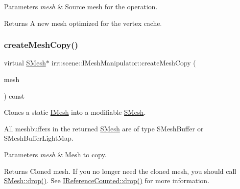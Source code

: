 \begin{DoxyParams}{Parameters}
{\em mesh} & Source mesh for the operation. \\
\hline
\end{DoxyParams}
\begin{DoxyReturn}{Returns}
A new mesh optimized for the vertex cache. 
\end{DoxyReturn}
\mbox{\label{classirr_1_1scene_1_1IMeshManipulator_a3d2e7401f1d43919834a1bfe0b65e77f}} 
\subsubsection{\texorpdfstring{create\+Mesh\+Copy()}{createMeshCopy()}}
{\footnotesize\ttfamily virtual \hyperlink{structirr_1_1scene_1_1SMesh}{S\+Mesh}$\ast$ irr\+::scene\+::\+I\+Mesh\+Manipulator\+::create\+Mesh\+Copy (\begin{DoxyParamCaption}\item[{\hyperlink{classirr_1_1scene_1_1IMesh}{I\+Mesh} $\ast$}]{mesh }\end{DoxyParamCaption}) const\hspace{0.3cm}{\ttfamily [pure virtual]}}



Clones a static \hyperlink{classirr_1_1scene_1_1IMesh}{I\+Mesh} into a modifiable \hyperlink{structirr_1_1scene_1_1SMesh}{S\+Mesh}. 

All meshbuffers in the returned \hyperlink{structirr_1_1scene_1_1SMesh}{S\+Mesh} are of type S\+Mesh\+Buffer or S\+Mesh\+Buffer\+Light\+Map. 
\begin{DoxyParams}{Parameters}
{\em mesh} & Mesh to copy. \\
\hline
\end{DoxyParams}
\begin{DoxyReturn}{Returns}
Cloned mesh. If you no longer need the cloned mesh, you should call \hyperlink{classirr_1_1IReferenceCounted_a03856a09355b89d178090c4a5f738543}{S\+Mesh\+::drop()}. See \hyperlink{classirr_1_1IReferenceCounted_a03856a09355b89d178090c4a5f738543}{I\+Reference\+Counted\+::drop()} for more information. 
\end{DoxyReturn}
\mbox{\label{classirr_1_1scene_1_1IMeshManipulator_a73051bc082f128a2e0592fb1a3da2b7d}} 
